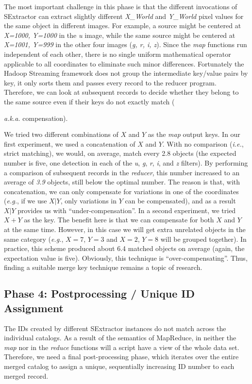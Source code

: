 The most important challenge in this phase is that the different invocations of SExtractor can extract slightly different \textit{X\_World} and \textit{Y\_World} pixel values for the same object in different images. For example, a source might be centered at \textit{X=1000, Y=1000} in the \textit{u} image, while the same source might be centered at \textit{X=1001, Y=999} in the other four images (\textit{g, r, i, z}). Since the \textit{map} functions run independent of each other, there is no single uniform mathematical operator applicable to all coordinates to eliminate such minor differences.
Fortunately the Hadoop Streaming framework does not group the intermediate key/value pairs by key, it only sorts them and passes every record to the reducer program. Therefore, we can look at subsequent records to decide whether they belong to the same source even if their keys do not exactly match ({\textit{a.k.a.} compensation).  

We tried two different combinations of $X$ and $Y$ as the \textit{map} output keys. In our first experiment, we used a concatenation of $X$ and $Y$. With no comparison (\textit{i.e.}, strict matching), we would, on average, match every 2.8 objects (the expected number is five, one detection in each of the \textit{u}, \textit{g}, \textit{r}, \textit{i}, and \textit{z} filters). By performing a comparison of subsequent records in the \textit{reducer}, this number increased to an average of \textit{3.9} objects, still below the optimal number. The reason is that, with concatenation, we can only compensate for variations in one of the coordinates (\textit{e.g.}, if we use $X|Y$, only variations in $Y$ can be compensated), and as a result $X|Y$ provides us with ``under-compensation''.
In a second experiment, we tried $X+Y$ as the key. The benefit here is that we can compensate for both $X$ and $Y$ at the same time. However, in this case we will get extra unrelated objects in the same category (\textit{e.g.}, $X=7$, $Y=3$ and $X=2$, $Y=8$ will be grouped together). In practice, this scheme produced about 6.4 matched objects on average (again, the expectation value is five). Obviously, this technique is ``over-compensating''. Thus, finding a suitable merge key technique remains a topic of research.

\subsection{Phase 4: Postprocessing / Unique ID Assignment} 
The IDs created by different SExtractor instances do not match across the individual catalogs. As a result of the semantics of MapReduce, in neither the \textit{map} nor in the \textit{reduce} functions will a script have a view of the whole data set. Therefore, we need a final post-processing phase, which iterates over the entire merged catalog to assign a unique, sequentially increasing ID number to each merged record.

}
